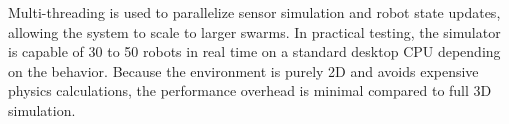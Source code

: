 Multi-threading is used to parallelize sensor simulation and robot state updates, allowing the system to scale to larger swarms. In practical testing, the simulator is capable of 30 to 50 robots in real time on a standard desktop CPU depending on the behavior. Because the environment is purely 2D and avoids expensive physics calculations, the performance overhead is minimal compared to full 3D simulation.
